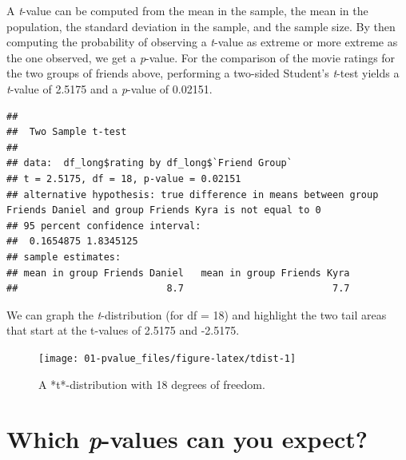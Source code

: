\documentclass[
]{krantz}
\newenvironment{Shaded}{\begin{snugshade}}{\end{snugshade}}
\newcommand{\AttributeTok}[1]{\textcolor[rgb]{0.77,0.63,0.00}{#1}}
\newcommand{\ConstantTok}[1]{\textcolor[rgb]{0.00,0.00,0.00}{#1}}
\newcommand{\FunctionTok}[1]{\textcolor[rgb]{0.00,0.00,0.00}{#1}}
\newcommand{\NormalTok}[1]{#1}
\newcommand{\SpecialCharTok}[1]{\textcolor[rgb]{0.00,0.00,0.00}{#1}}
\newcommand{\StringTok}[1]{\textcolor[rgb]{0.31,0.60,0.02}{#1}}
\begin{document}
A \emph{t}-value can be computed from the mean in the sample, the mean in the population, the standard deviation in the sample, and the sample size. By then computing the probability of observing a \emph{t}-value as extreme or more extreme as the one observed, we get a \emph{p}-value. For the comparison of the movie ratings for the two groups of friends above, performing a two-sided Student's \emph{t}-test yields a \emph{t}-value of 2.5175 and a \emph{p}-value of 0.02151.

\begin{Shaded}
\end{Shaded}

\begin{verbatim}
## 
##  Two Sample t-test
## 
## data:  df_long$rating by df_long$`Friend Group`
## t = 2.5175, df = 18, p-value = 0.02151
## alternative hypothesis: true difference in means between group Friends Daniel and group Friends Kyra is not equal to 0
## 95 percent confidence interval:
##  0.1654875 1.8345125
## sample estimates:
## mean in group Friends Daniel   mean in group Friends Kyra 
##                          8.7                          7.7
\end{verbatim}

We can graph the \emph{t}-distribution (for df = 18) and highlight the two tail areas that start at the t-values of 2.5175 and -2.5175.

\begin{figure}

{\centering \texttt{[image: 01-pvalue\_files/figure-latex/tdist-1]} 

}

\caption{A *t*-distribution with 18 degrees of freedom.}\label{fig:tdist}
\end{figure}

\hypertarget{which-p-values-can-you-expect}{%
\section{\texorpdfstring{Which \emph{p}-values can you expect?}{Which p-values can you expect?}}\label{which-p-values-can-you-expect}}
\end{document}
